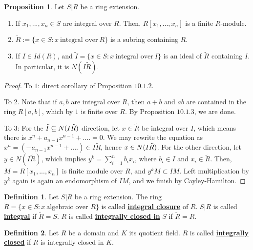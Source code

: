 \documentclass{article}
\theoremstyle{definition}
\theoremstyle{definition}
\theoremstyle{definition}
\newtheorem{proposition}{Proposition}[section]
\theoremstyle{definition}
\theoremstyle{definition}
\newtheorem{definition}{Definition}[section]
\theoremstyle{definition}
\theoremstyle{definition}
\begin{document}
\begin{tcolorbox}[colback=blue!5!white,colframe=blue!30!white]
\begin{proposition}
Let $S|R$ be a ring extension. 
\begin{enumerate}
    \item If $x_1,...,x_n\in S$ are integral over $R$. Then, $R[x_1,...,x_n]$ is a finite $R$-module. 
    \item $\tilde{R}:=\{ x\in S: x \ \textrm{integral over} \ R \}$ is a subring containing $R$. 
    \item If $I\in Id(R)$, and $\tilde{I}=\{ x\in S: x \  \textrm{integral over} \ I \}$ is an ideal of $\tilde{R}$ containing $I$. In particular, it is $N(I\tilde{R})$. 
\end{enumerate}
\end{proposition}
\end{tcolorbox}
\begin{proof}
    To $1$: direct corollary of Proposition $10.1.2$.
    
    To $2$. Note that if $a,b$ are integral over $R$, then $a+b$ and $ab$ are contained in the ring $R[a,b]$, which by $1$ is finite over $R$. By Proposition $10.1.3$, we are done. 
    
    
    To $3$: For the $\tilde{I}\subseteq N(I\Tilde{R})$ direction, let $x\in \tilde{R}$ be integral over $I$, which means there is $x^n+a_{n-1}x^{n-1}+....=0$. We may rewrite the equation as $x^n=(-a_{n-1}x^{n-1}+....)\in I\tilde{R}$, hence $x\in N(I\Tilde{R})$. For the other direction, let $y\in N(I\tilde{R})$, which implies $y^k=\sum_{i=1}^{n}b_ix_i$, where $b_i\in I$ and $x_i\in \tilde{R}$. Then, $M=R[x_1,...,x_n]$ is finite module over $R$, and $y^kM\subset IM$. Left multiplication by $y^k$ again is again an endomorphism of $IM$, and we finish by Cayley-Hamilton. 
\end{proof}


\begin{tcolorbox}[colback=purple!5!white,colframe=purple!75!black]
\begin{definition}
Let $S|R$ be a ring extension. The ring $\tilde{R}=\{ x\in S: x \  \textrm{algebraic over } R \}$ is called  \underline{\textbf{integral closure}} of $R$. $S|R$ is called \underline{\textbf{integral}} if $\tilde{R}=S$. $R$ is called \underline{\textbf{integrally closed in}} $S$ if $\tilde{R}=R$.
\end{definition}
\end{tcolorbox}


\begin{tcolorbox}[colback=purple!5!white,colframe=purple!75!black]
\begin{definition}
Let $R$ be a domain and $K$ its quotient field. $R$ is called \underline{\textbf{integrally closed}} if $R$ is integrally closed in $K$.
\end{definition}
\end{tcolorbox}
\end{document}

